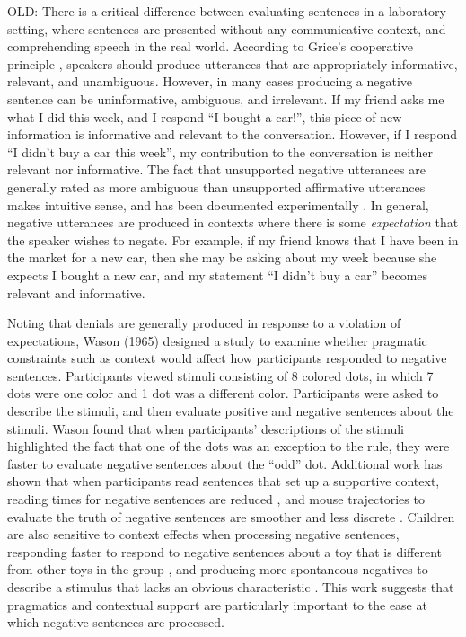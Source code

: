 \documentclass[man]{apa2}
\begin{document}
OLD:
There is a critical difference between evaluating sentences in a laboratory setting, where sentences are presented without any communicative context, and comprehending speech in the real world. According to Grice's cooperative principle \cite{grice1975}, speakers should produce utterances that are appropriately informative, relevant, and unambiguous.  However, in many cases producing a negative sentence can be uninformative, ambiguous, and irrelevant.  If my friend asks me what I did this week, and I respond ``I bought a car!'', this piece of new information is informative and relevant to the conversation.  However, if I respond ``I didn't buy a car this week'', my contribution to the conversation is neither relevant nor informative.  The fact that unsupported negative utterances are generally rated as more ambiguous than unsupported affirmative utterances makes intuitive sense, and has been documented experimentally \cite{glenberg1999}.  In general, negative utterances are produced in contexts where there is some \emph{expectation} that the speaker wishes to negate.  For example, if my friend knows that I have been in the market for a new car, then she may be asking about my week because she expects I bought a new car, and my statement ``I didn't buy a car'' becomes relevant and informative.  

Noting that denials are generally produced in response to a violation of expectations, Wason (1965) designed a study to examine whether pragmatic constraints such as context would affect how participants responded to negative sentences.  Participants viewed stimuli consisting of 8 colored dots, in which 7 dots were one color and 1 dot was a different color.  Participants were asked to describe the stimuli, and then evaluate positive and negative sentences about the stimuli.  Wason found that when participants' descriptions of the stimuli highlighted the fact that one of the dots was an exception to the rule, they were faster to evaluate negative sentences about the ``odd'' dot.  Additional work has shown that when participants read sentences that set up a supportive context, reading times for negative sentences are reduced \cite{glenberg1999, ludtke2006}, and mouse trajectories to evaluate the truth of negative sentences are smoother and less discrete \cite{dale2011}.  Children are also sensitive to context effects when processing negative sentences, responding faster to respond to negative sentences about a toy that is different from other toys in the group \cite{devilliers1975}, and producing more spontaneous negatives to describe a stimulus that lacks an obvious characteristic \cite{watson1979}.  This work suggests that pragmatics and contextual support are particularly important to the ease at which negative sentences are processed.   
\end{document}
